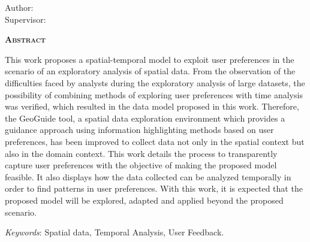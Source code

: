 \begin{center}
	{\Large{\textbf{\myThesisEnglish}}}
\end{center}

\vspace{1cm}

\begin{flushright}
	Author: \myName\\
	Supervisor: \mySupervisorName
\end{flushright}

\vspace{1cm}

\begin{center}
	\Large{\textsc{\textbf{Abstract}}}
\end{center}

\noindent This work proposes a spatial-temporal model to exploit user preferences in the scenario of an exploratory analysis of spatial data. From the observation of the difficulties faced by analysts during the exploratory analysis of large datasets, the possibility of combining methods of exploring user preferences with time analysis was verified, which resulted in the data model proposed in this work. Therefore, the GeoGuide tool, a spatial data exploration environment which provides a guidance approach using information highlighting methods based on user preferences, has been improved to collect data not only in the spatial context but also in the domain context. This work details the process to transparently capture user preferences with the objective of making the proposed model feasible. It also displays how the data collected can be analyzed temporally in order to find patterns in user preferences. With this work, it is expected that the proposed model will be explored, adapted and applied beyond the proposed scenario.

\noindent\textit{Keywords}: Spatial data, Temporal Analysis, User Feedback.
